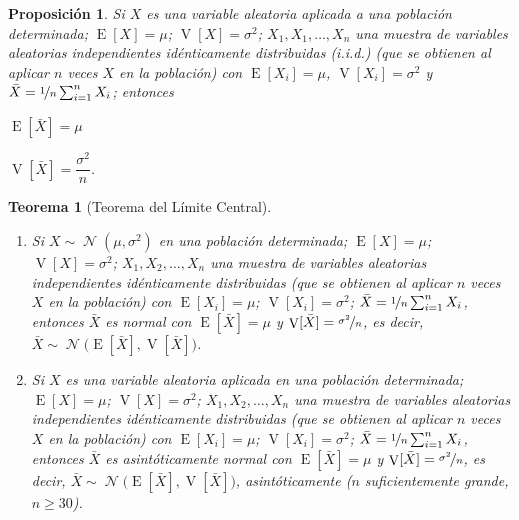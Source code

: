 \documentclass[a5paper,doc,10pt,noapacite]{apa6}
\DeclareMathOperator{\Esp}{E}
\DeclareMathOperator{\Var}{V}
\DeclareMathOperator{\Normal}{\mathcal{N}}
\newtheorem{proposicion}{Proposición}
\newtheorem{teorema}{Teorema}
\begin{document}
{{\begin{proposicion}\label{prop-4.1}
	Si  \(X\) es una variable aleatoria aplicada a una población determinada; \(\Esp[X]=\mu\); \(\Var[X]=\sigma^2\); \(X_1,X_1,\ldots,X_n\) una muestra de variables aleatorias independientes idénticamente distribuidas (i.i.d.) (que se obtienen al aplicar \(n\) veces \(X\) en la población) con \(\Esp[X_i]=\mu\), \(\Var[X_i]=\sigma^2\) y \(\bar{X}=\nicefrac{1}{n}\sum_{i=1}^{n}X_i\); entonces
	\begin{seriate}
		\item \(\Esp[\bar{X}]=\mu\)
		\item \(\Var[\bar{X}]=\dfrac{\sigma^2}{n}\).
	\end{seriate}
\end{proposicion}


\begin{teorema}[Teorema del Límite Central]\quad
	\begin{enumerate}
		\item Si \(X\sim \Normal(\mu,\sigma^2)\) en una población determinada; \(\Esp[X]=\mu\); \(\Var[X]=\sigma^2\); \(X_1,X_2,\ldots, X_n\) una muestra de variables aleatorias independientes idénticamente distribuidas (que se obtienen al aplicar \(n\) veces \(X\) en la población) con \(\Esp[X_i]=\mu\); \(\Var[X_i]=\sigma^2\); \(\bar{X}=\nicefrac{1}{n}\sum_{i=1}^{n}X_i\), entonces \(\bar{X}\) es normal con \(\Esp[\bar{X}]=\mu\) y \(\Var[\bar{X}]=\nicefrac{\sigma^2}{n}\), es decir, \(\bar{X}\sim\Normal\big( \Esp[\bar{X}],\Var[\bar{X}]\big)\).
		\item Si \(X\) es una variable aleatoria aplicada en una población determinada; \(\Esp[X]=\mu\); \(\Var[X]=\sigma^2\); \(X_1,X_2,\ldots,X_n\) una muestra de variables aleatorias independientes idénticamente distribuidas (que se obtienen al aplicar \(n\) veces \(X\) en la población) con \(\Esp[X_i]=\mu\); \(\Var[X_i]=\sigma^2\); \(\bar{X}=\nicefrac{1}{n}\sum_{i=1}^{n}X_i\), entonces \(\bar{X}\) es asintóticamente normal con \(\Esp[\bar{X}]=\mu\) y \(\Var[\bar{X}]=\nicefrac{\sigma^2}{n}\), es decir, \(\bar{X}\sim\Normal\big(\Esp[\bar{X}],\Var[\bar{X}]\big)\), asintóticamente (\(n\) suficientemente grande, \(n\geq 30\)).
	\end{enumerate}
\end{teorema}

}}
\end{document}
